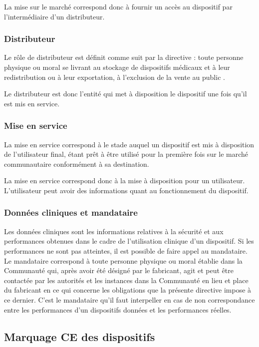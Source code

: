 La mise sur le marché correspond donc à fournir un accès  au dispositif par l'intermédiaire d'un distributeur.

\subsubsection{Distributeur}
Le rôle de distributeur est définit comme suit par la directive : \og toute personne physique ou moral se livrant au stockage de dispositifs médicaux et à leur redistribution ou à leur exportation, à l'exclusion de la vente au public \fg .

Le distributeur est donc l'entité qui met à disposition le dispositif une fois qu'il est mis en service.

\subsubsection{Mise en service}
La mise en service correspond à \og le stade auquel un dispositif est mis à disposition de l'utilisateur final, étant prêt à être utilisé pour la première fois sur le marché communautaire conformément à sa destination\fg . 

La mise en service correspond donc à la mise à disposition pour un utilisateur. L'utilisateur peut avoir des informations quant au fonctionnement du dispositif.

\subsubsection{Données cliniques et mandataire}
Les données cliniques sont \og les informations relatives à la sécurité et aux performances obtenues dans le cadre de l'utilisation clinique d'un dispositif\fg . Si les performances ne sont pas atteintes, il est possible de faire appel au mandataire.
Le mandataire correspond à \og toute personne physique ou moral établie dans la Communauté qui, après avoir été désigné par le fabricant, agit et peut être contactée par les autorités et les instances dans la Communauté en lieu et place du fabricant en ce qui concerne les obligations que la présente directive impose à ce dernier\fg . C'est le mandataire qu'il faut interpeller en cas de non correspondance entre les performances d'un dispositifs données et les performances réelles. 

\subsection{Marquage CE des dispositifs}
